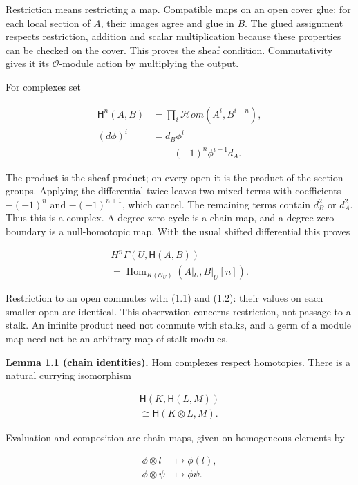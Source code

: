 \documentclass[
  english,
  11pt,
  a4paper,
]{article}
\begin{document}
Restriction means restricting a map. Compatible maps on an open cover
glue: for each local section of \(A\), their images agree and glue in
\(B\). The glued assignment respects restriction, addition and scalar
multiplication because these properties can be checked on the cover.
This proves the sheaf condition. Commutativity gives it its
\(\mathcal O\)-module action by multiplying the output.

For complexes set

\[\begin{aligned}
\mathsf H^n(A,B)&=\prod_i\mathcal Hom(A^i,B^{i+n}),\\
(d\phi)^i&=d_B\phi^i\\
&\quad-(-1)^n\phi^{i+1}d_A.
\end{aligned}
\tag{1.2}\]

The product is the sheaf product; on every open it is the product of the
section groups. Applying the differential twice leaves two mixed terms
with coefficients \(-(-1)^n\) and \(-(-1)^{n+1}\), which cancel. The
remaining terms contain \(d_B^2\) or \(d_A^2\). Thus this is a complex.
A degree-zero cycle is a chain map, and a degree-zero boundary is a
null-homotopic map. With the usual shifted differential this proves

\[\begin{gathered}
H^n\Gamma(U,\mathsf H(A,B))\\
=\operatorname{Hom}_{K(\mathcal O_U)}(A|_U,B|_U[n]).
\end{gathered}
\tag{1.3}\]

Restriction to an open commutes with (1.1) and (1.2): their values on
each smaller open are identical. This observation concerns restriction,
not passage to a stalk. An infinite product need not commute with
stalks, and a germ of a module map need not be an arbitrary map of stalk
modules.

\textbf{Lemma 1.1 (chain identities).} Hom complexes respect homotopies.
There is a natural currying isomorphism

\[\begin{gathered}
\mathsf H(K,\mathsf H(L,M))\\
\cong\mathsf H(K\otimes L,M).
\end{gathered}
\tag{1.4}\]

Evaluation and composition are chain maps, given on homogeneous elements
by

\[\begin{aligned}
\phi\otimes l&\longmapsto\phi(l),\\
\phi\otimes\psi&\longmapsto\phi\psi.
\end{aligned}
\tag{1.5}\]
\end{document}
